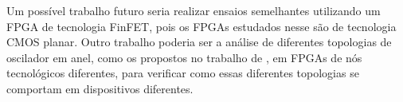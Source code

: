 Um possível trabalho futuro seria realizar ensaios semelhantes utilizando um FPGA de tecnologia FinFET, pois os FPGAs estudados nesse são de tecnologia CMOS planar. Outro trabalho poderia ser a análise de diferentes topologias de oscilador em anel, como os propostos no trabalho de \cite{Sato}, em FPGAs de nós tecnológicos diferentes, para verificar como essas diferentes topologias se comportam em dispositivos diferentes.














